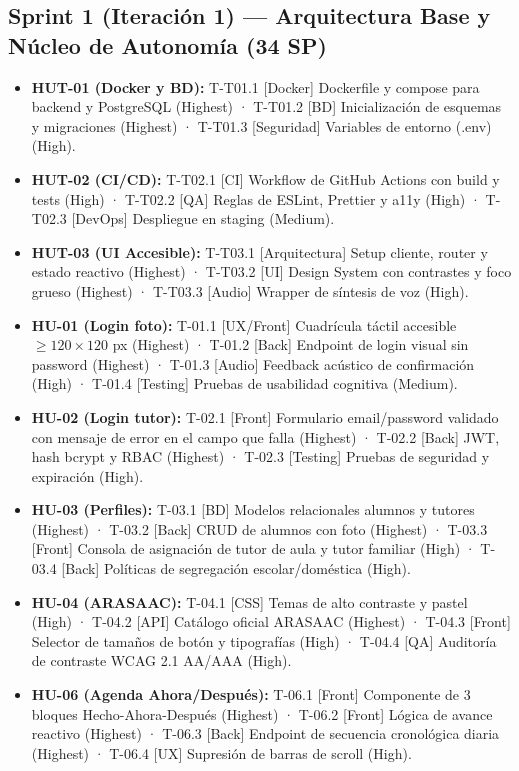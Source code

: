 \documentclass[11pt,a4paper]{article}
\begin{document}
\subsection{Sprint 1 (Iteración 1) — Arquitectura Base y Núcleo de Autonomía (34 SP)}
\begin{itemize}
\item \textbf{HUT-01 (Docker y BD):} T-T01.1 [Docker] Dockerfile y compose para backend y PostgreSQL (Highest) · T-T01.2 [BD] Inicialización de esquemas y migraciones (Highest) · T-T01.3 [Seguridad] Variables de entorno (.env) (High).
\item \textbf{HUT-02 (CI/CD):} T-T02.1 [CI] Workflow de GitHub Actions con build y tests (High) · T-T02.2 [QA] Reglas de ESLint, Prettier y a11y (High) · T-T02.3 [DevOps] Despliegue en staging (Medium).
\item \textbf{HUT-03 (UI Accesible):} T-T03.1 [Arquitectura] Setup cliente, router y estado reactivo (Highest) · T-T03.2 [UI] Design System con contrastes y foco grueso (Highest) · T-T03.3 [Audio] Wrapper de síntesis de voz (High).
\item \textbf{HU-01 (Login foto):} T-01.1 [UX/Front] Cuadrícula táctil accesible $\geq 120 \times 120$ px (Highest) · T-01.2 [Back] Endpoint de login visual sin password (Highest) · T-01.3 [Audio] Feedback acústico de confirmación (High) · T-01.4 [Testing] Pruebas de usabilidad cognitiva (Medium).
\item \textbf{HU-02 (Login tutor):} T-02.1 [Front] Formulario email/password validado con mensaje de error en el campo que falla (Highest) · T-02.2 [Back] JWT, hash bcrypt y RBAC (Highest) · T-02.3 [Testing] Pruebas de seguridad y expiración (High).
\item \textbf{HU-03 (Perfiles):} T-03.1 [BD] Modelos relacionales alumnos y tutores (Highest) · T-03.2 [Back] CRUD de alumnos con foto (Highest) · T-03.3 [Front] Consola de asignación de tutor de aula y tutor familiar (High) · T-03.4 [Back] Políticas de segregación escolar/doméstica (High).
\item \textbf{HU-04 (ARASAAC):} T-04.1 [CSS] Temas de alto contraste y pastel (High) · T-04.2 [API] Catálogo oficial ARASAAC (Highest) · T-04.3 [Front] Selector de tamaños de botón y tipografías (High) · T-04.4 [QA] Auditoría de contraste WCAG 2.1 AA/AAA (High).
\item \textbf{HU-06 (Agenda Ahora/Después):} T-06.1 [Front] Componente de 3 bloques Hecho-Ahora-Después (Highest) · T-06.2 [Front] Lógica de avance reactivo (Highest) · T-06.3 [Back] Endpoint de secuencia cronológica diaria (Highest) · T-06.4 [UX] Supresión de barras de scroll (High).

\end{itemize}
\end{document}
